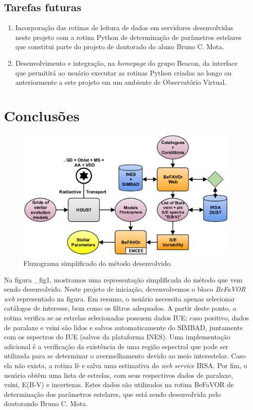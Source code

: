 \documentclass[letterpaper,10pt,english]{sphinxmanual}
\begin{document}
\section{Tarefas futuras}
\label{index:tarefas-futuras}\begin{enumerate}
\item {} 
Incorporação das rotinas de leitura de dados em servidores desenvolvidas neste projeto com a rotina Python de determinação de parâmetros estelares que constitui parte do projeto de doutorado do aluno Bruno C. Mota.

\item {} 
Desenvolvimento e integração, na \emph{homepage} do grupo Beacon, da interface que permitirá ao usuário executar as rotinas Python criadas ao longo ou anteriormente a este projeto em um ambiente de Observatório Virtual.

\end{enumerate}


\chapter{Conclusões}
\label{index:conclusoes}\begin{figure}[htbp]
\centering
\capstart

\includegraphics[width=0.600\linewidth]{befavor.png}
\caption{Fluxograma simplificado do método desenvolvido.}\label{index:fig1}\end{figure}

Na figura \_fig1, mostramos uma representação simplificada do método que vem sendo desenvolvido. Neste projeto de iniciação, devenvolvemos o bloco \emph{BeFaVOR web} representado na figura. Em resumo, o usuário necessita apenas selecionar catálogos de interesse, bem como os filtros adequados. A partir deste ponto, a rotina verifica se as estrelas selecionadas possuem dados IUE; caso positivo, dados de paralaxe e vsini são lidos e salvos automaticamente do SIMBAD, juntamente com os espectros do IUE (salvos da plataforma INES). Uma implementação adicional é a verificação da existência de uma região espectral que pode ser utilizada para se determinar o avermelhamento devido ao meio interestelar. Caso ela não exista, a rotina lê e salva uma estimativa do \emph{web service} IRSA. Por fim, o usuário obtêm uma lista de estrelas, com seus respectivos dados de paralaxe, vsini, E(B-V) e incertezas. Estes dados são utilizados na rotina BeFaVOR de determinação dos parâmetros estelares, que está sendo desenvolvida pelo doutorando Bruno C. Mota.
\end{document}
